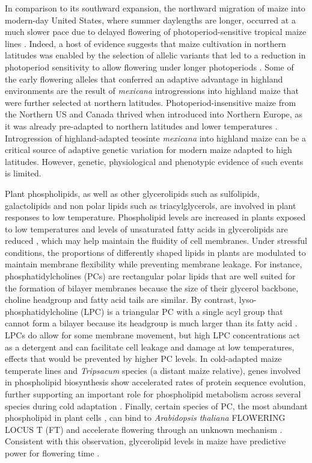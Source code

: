 \documentclass[9pt,twocolumn,twoside,lineno]{biorxiv}
\newcommand{\mex}{\textit{mexicana}\xspace}
\begin{document}
In comparison to its southward expansion, the northward migration of maize into modern-day United States, where summer daylengths are longer, occurred at a much slower pace \cite{Da_Fonseca2015-zh, Swarts2017-ge} due to delayed flowering of photoperiod-sensitive tropical maize lines \cite{Hung2012-ms}.
Indeed, a host of evidence suggests that maize cultivation in northern latitudes was enabled by the selection of allelic variants that led to a reduction in photoperiod sensitivity to allow flowering under longer photoperiods \cite{Liang2018-af, Guo2018-on, Coles2010-db, Huang2018-ga, Yang2013-lg, Salvi2007-ku, Hung2012-ms}.
Some of the early flowering alleles that conferred an adaptive advantage in highland environments are the result of \mex introgressions into highland maize \cite{Guo2018-on} that were further selected at northern latitudes.
Photoperiod-insensitive maize from the Northern US and Canada thrived when introduced into Northern Europe, as it was already pre-adapted to northern latitudes and lower temperatures \cite{Brandenburg2017-ii}.
Introgression of highland-adapted teosinte \mex into highland maize can be a critical source of adaptive genetic variation for modern maize adapted to high latitudes.
However, genetic, physiological and phenotypic evidence of such events is  limited.

Plant phospholipids, as well as other glycerolipids such as sulfolipids, galactolipids and non polar lipids such as triacylglycerols, are involved in plant responses to low temperature.
Phospholipid levels are increased in plants exposed to low temperatures \cite{Degenkolbe2012-wf} and levels of unsaturated fatty acids in glycerolipids are reduced \cite{Welti2002-uk, Lynch1987-ln}, which may help maintain the fluidity of cell membranes.
Under stressful conditions, the proportions of differently shaped lipids in plants are modulated to maintain membrane flexibility while preventing membrane leakage. 
For instance, phosphatidylcholines (PCs) are rectangular polar lipids that are well suited for the formation of bilayer membranes because the size of their glycerol backbone, choline headgroup and fatty acid tails are similar.
By contrast, lyso-phosphatidylcholine (LPC) is a triangular PC with a single acyl group that cannot form a bilayer because its headgroup is much larger than its fatty acid \cite{Jouhet2013-fv}.
LPCs do allow for some membrane movement, but high LPC concentrations act as a detergent \cite{Henriksen2010-cm} and can facilitate cell leakage and damage at low temperatures, effects that would be prevented by higher PC levels.
In cold-adapted maize temperate lines and \textit{Tripsacum} species (a distant maize relative), genes involved in  phospholipid biosynthesis show accelerated rates of protein sequence evolution, further supporting an important role for phospholipid metabolism across several species during cold adaptation \cite{Yan2019-tx}. 
Finally, certain species of PC, the most abundant phospholipid  in plant cells \cite{Gu2017-nd}, can bind to \textit{Arabidopsis thaliana} FLOWERING LOCUS T (FT) and accelerate flowering through an unknown mechanism \cite{Nakamura2014-qf}. 
Consistent with this observation, glycerolipid levels in maize have predictive power for flowering time \cite{Riedelsheimer2013-bd}. 
\end{document}
